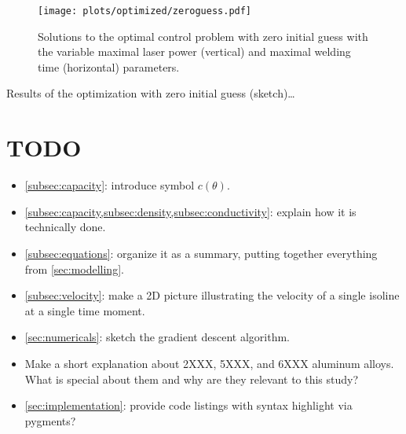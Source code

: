 \begin{figure} \label{fig:zeroguess}
	\centering
	\texttt{[image: plots/optimized/zeroguess.pdf]}
	\caption{Solutions to the optimal control problem with zero initial guess with the variable maximal laser power (vertical) and maximal welding time (horizontal) parameters.}
\end{figure}

\begin{table} \label{tab:zeroguess}
	\centering
	
	\caption{Results of the optimization with zero initial guess (sketch)\ldots}
\end{table}

\appendix


\section{TODO}
\begin{itemize}
	\item \cref{subsec:capacity}: introduce symbol $c(\theta)$.
	\item \cref{subsec:capacity,subsec:density,subsec:conductivity}: explain how it is technically done.
	\item \cref{subsec:equations}: organize it as a summary, putting together everything from \cref{sec:modelling}.
	\item \cref{subsec:velocity}: make a 2D picture illustrating the velocity of a single isoline at a single time moment.
	\item \cref{sec:numericals}: sketch the gradient descent algorithm.
	\item Make a short explanation about 2XXX, 5XXX, and 6XXX aluminum alloys. What is special about them and why are they relevant to this study?
	\item \cref{sec:implementation}: provide code listings with syntax highlight via pygments?
\end{itemize}
